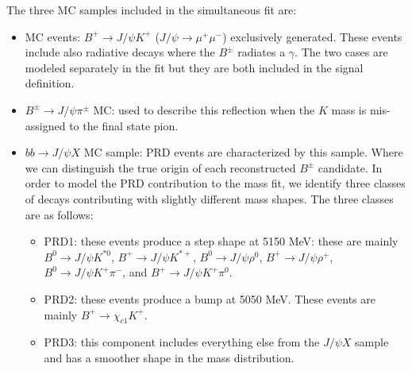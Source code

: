The three MC samples included in the simultaneous fit are:
\begin{itemize}
    \setlength{\itemsep}{0pt}%
	\setlength{\parskip}{0pt}%
    \item \BpmKpmJpsi{} MC events: $B^+\to J/\psi K^+$ ($J/\psi\to\mu^+\mu^-$)
	exclusively generated. These events include also radiative decays where
	the $B^\pm$ radiates a $\gamma$. The two cases are modeled separately in
	the fit but they are both included in the signal definition.
    \item $B^\pm\to J/\psi\pi^\pm$ MC: used to describe this reflection when the
	$K$ mass is mis-assigned to the final state pion.
    \item $bb\to J/\psi X$ MC sample: PRD events are characterized by this sample.
	Where we can distinguish the true origin of each reconstructed
	$B^\pm$ candidate. In order to model the PRD contribution to the mass fit,
	we identify three classes of decays contributing with slightly different mass shapes.
	The three classes are as follows:
	\begin{itemize}
	    \item PRD1: these events produce a step shape at 5150 MeV:
		these are mainly
		$B^0\rightarrow J/\psi  K^{*0}$,
		$B^+\rightarrow J/\psi  K^{*+}$,
		$B^0\rightarrow J/\psi  \rho^{0}$,
		$B^+\rightarrow J/\psi  \rho^{+}$,
		$B^0\rightarrow J/\psi  K^+\pi^-$, and
		$B^+\rightarrow J/\psi  K^+\pi^{0}$.
	    \item PRD2: these events produce a bump at 5050 MeV.
		These events are mainly 
		$B^+\rightarrow\chi_{c1}K^+$.
	    \item PRD3: this component includes everything else
		from the $J/\psi X$ sample and has a smoother shape
		in the mass distribution.
	\end{itemize}
\end{itemize}

